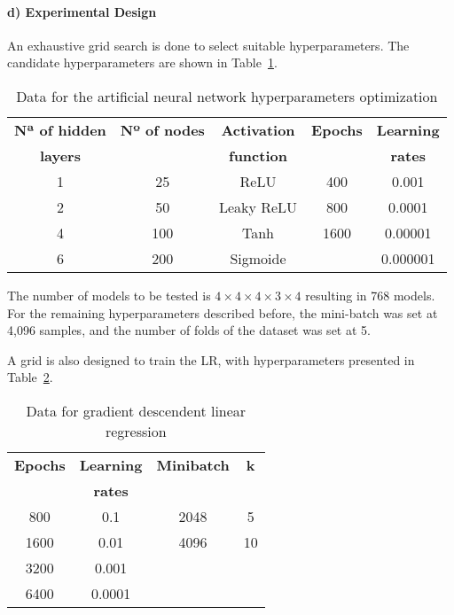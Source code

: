 \documentclass[conference]{IEEEtran}
\begin{document}
\paragraph*{d) Experimental Design} 

An exhaustive grid search is done to select suitable hyperparameters.
The candidate hyperparameters are shown in Table~\ref{table3}.


\begin{table}[!t]
\renewcommand{\arraystretch}{1.3}
\caption{Data for the artificial neural network hyperparameters optimization}
\label{table3}
\centering
\begin{tabular}{c || c || c || c || c}
\hline
\bfseries Nª of hidden & \bfseries Nº of nodes & \bfseries Activation & \bfseries Epochs & \bfseries Learning \\
\bfseries layers & \bfseries & \bfseries function &  & \bfseries rates \\

\hline\hline

1	&	25	&	ReLU		&	400	&	0.001 \\
2 	& 	50 	&	Leaky ReLU	&	800	&	0.0001 \\
4 	& 	100 	&	Tanh			&	1600	&	0.00001 \\
6 	&	200	&	Sigmoide		&	 	&	0.000001 \\

\hline
\end{tabular}
\end{table}

The number of models to be tested is $4\times4\times4\times3\times4$ resulting in 768 models. For the remaining hyperparameters described before, the mini-batch was set at 4,096 samples, and the number of folds of the dataset was set at 5.

A grid is also designed to train the LR, with hyperparameters presented in Table~\ref{table4}.

\begin{table}[!t]
\renewcommand{\arraystretch}{1.3}
\caption{Data for gradient descendent linear regression}
\label{table4}
\centering
\begin{tabular}{c || c || c || c }
\hline
\bfseries Epochs 	& \bfseries Learning & \bfseries Minibatch & \bfseries k  	\\
\bfseries  			& \bfseries  rates 	& \bfseries 		& \bfseries        \\

\hline\hline

800		&	0.1		&	2048		&	5	\\
1600		&	0.01		&	4096		&	10	\\
3200		&	0.001	&			&		\\							
6400		&	0.0001	&			&		\\


\hline
\end{tabular}
\end{table}
\end{document}
